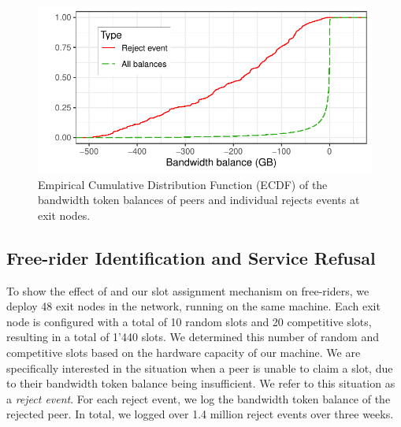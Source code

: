 
\begin{figure}[t]
	\centering
	\includegraphics[width=.8\linewidth]{trustchain/assets/exit_node_rejects}
	\caption{Empirical Cumulative Distribution Function (ECDF) of the bandwidth token balances of peers and individual rejects events at exit nodes.}
	\label{fig:exit_node_rejects}
\end{figure}

\subsection{Free-rider Identification and Service Refusal}
To show the effect of \TrustChain{} and our slot assignment mechanism on free-riders, we deploy 48 exit nodes in the \Tribler{} network, running on the same machine.
Each exit node is configured with a total of 10 random slots and 20 competitive slots, resulting in a total of 1'440 slots.
We determined this number of random and competitive slots based on the hardware capacity of our machine.
We are specifically interested in the situation when a peer is unable to claim a slot, due to their bandwidth token balance being insufficient.
We refer to this situation as a \emph{reject event}.
For each reject event, we log the bandwidth token balance of the rejected peer.
In total, we logged over 1.4 million reject events over three weeks.

